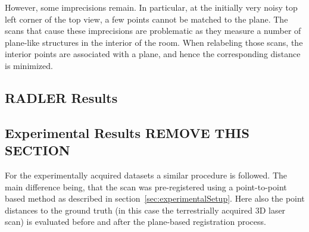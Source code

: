 However, some imprecisions remain. 
In particular, at the initially very noisy top left corner of the top view, a few points cannot be matched to the plane. 
The scans that cause these imprecisions are problematic as they measure a number of plane-like structures in the interior of the room. 
When relabeling those scans, the interior points are associated with a plane, and hence the corresponding distance is minimized. 


\iffalse
\subsection{RADLER Results}

\subsection{Experimental Results REMOVE THIS SECTION}

For the experimentally acquired datasets a similar procedure is followed. 
The main difference being, that the scan was pre-registered using a point-to-point based method as described in section~\ref{sec:experimentalSetup}. 
Here also the point distances to the ground truth (in this case the terrestrially acquired 3D laser scan) is evaluated before and after the plane-based registration process. 

